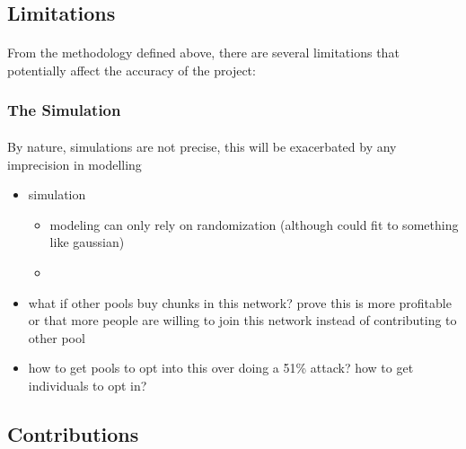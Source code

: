 \subsection{Limitations}

\paragraph{} From the methodology defined above, there are several limitations that potentially affect the accuracy of the project:

\subsubsection{The Simulation}

\paragraph{} By nature, simulations are not precise, this will be exacerbated by any imprecision in modelling

\begin{itemize}
  \item simulation
    \begin{itemize}
      \item modeling can only rely on randomization (although could fit to something like gaussian)
      \item
    \end{itemize}
  \item what if other pools buy chunks in this network? prove this is more profitable or that more people are willing to join this network instead of contributing to other pool
  \item how to get pools to opt into this over doing a 51\% attack? how to get individuals to opt in?
\end{itemize}

\subsection{Contributions}